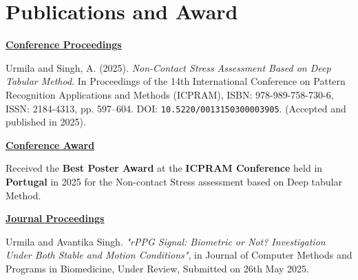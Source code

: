 
\chapter*{Publications and Award}

\noindent

\begin{center}
\large{\textbf{\underline{Conference Proceedings}}}
\end{center}


     Urmila and Singh, A. (2025). \textit{Non-Contact Stress Assessment Based on Deep Tabular Method}. In Proceedings of the 14th International Conference on Pattern Recognition Applications and Methods (ICPRAM), ISBN: 978-989-758-730-6, ISSN: 2184-4313, pp. 597--604. DOI: \texttt{10.5220/0013150300003905}. (Accepted and published in 2025).


\vspace{0.5cm}
\noindent
\begin{center}
\large{\textbf{\underline{Conference Award}}}
\end{center}


Received the \textbf{Best Poster Award} at the \textbf{ICPRAM Conference} held in \textbf{Portugal} in 2025 for the Non-contact Stress assessment based on Deep tabular Method.

\vspace{0.5cm}
\begin{center}
\large{\textbf{\underline{Journal Proceedings}}}
\end{center}


     Urmila and Avantika Singh. \textit{"rPPG Signal: Biometric or Not? Investigation Under Both Stable and Motion Conditions"}, in Journal of  Computer Methods and Programs in Biomedicine, Under Review, Submitted on 26th May 2025.

